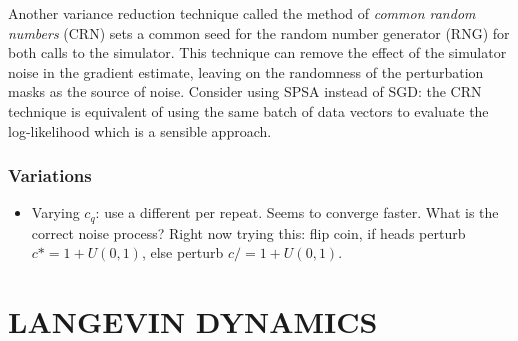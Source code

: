 \documentclass[]{article}
\begin{document}
Another variance reduction technique called the method of {\em common random numbers} (CRN) \cite{kleinman1999} sets a common seed for the random number generator (RNG) for both calls to the simulator.  This technique can remove the effect of the simulator noise in the gradient estimate, leaving on the randomness of the perturbation masks as the source of noise. Consider using SPSA instead of SGD: the CRN technique is equivalent of using the same batch of data vectors to evaluate the log-likelihood which is a sensible approach.

\subsubsection{Variations}

\begin{itemize}
\item Varying $c_q$: use a different per repeat.  Seems to converge faster.  What is the correct noise process?  Right now trying this: flip coin, if heads perturb $c *= 1+U(0,1)$, else perturb $c /= 1 + U(0,1)$. 
\end{itemize}

\section{LANGEVIN DYNAMICS} \label{ld}


\end{document}
